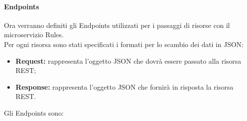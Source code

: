 \paragraph{Endpoints}

Ora verranno definiti gli Endpoints utilizzati per i passaggi di risorse con il microservizio Rules.\\ 
Per ogni risorsa sono stati specificati i formati per lo scambio dei dati in JSON: 
\begin{itemize}
\item \textbf{Request:} rappresenta l’oggetto JSON che dovrà essere passato alla risorsa REST;
\item \textbf{Response:} rappresenta l’oggetto JSON che fornirà in risposta la risorsa REST.
\end{itemize}
Gli Endpoints sono: 

